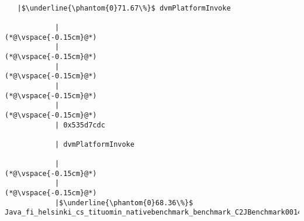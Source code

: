 
\begin{lstlisting}[caption=Metodikutsu C$\to$Java 20 int-parametrilla, label=profile:C2JBenchmark00146, numberbychapter=true, frame=lines, float, floatplacement=t]

   |$\underline{\phantom{0}71.67\%}$ dvmPlatformInvoke

            |
(*@\vspace{-0.15cm}@*)
            |
(*@\vspace{-0.15cm}@*)
            |
(*@\vspace{-0.15cm}@*)
            |
(*@\vspace{-0.15cm}@*)
            |
(*@\vspace{-0.15cm}@*)
            | 0x535d7cdc

            | dvmPlatformInvoke

            |
(*@\vspace{-0.15cm}@*)
            |
(*@\vspace{-0.15cm}@*)
            |$\underline{\phantom{0}68.36\%}$ Java_fi_helsinki_cs_tituomin_nativebenchmark_benchmark_C2JBenchmark00146_runInternal


\end{lstlisting}
